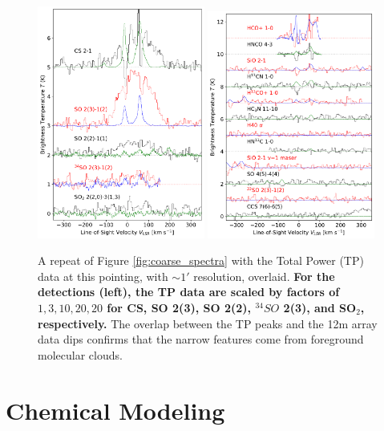 \documentclass[]{aastex631}
\def\rr#1{\textbf{#1}}
\begin{document}
\begin{figure}
    \centering
    \includegraphics[width=0.49\textwidth]{figures/CSandSO_Overlays_withTP.pdf}
    \includegraphics[width=0.49\textwidth]{figures/NonDetection_Overlays_withTP.pdf}
    \caption{A repeat of Figure \ref{fig:coarse_spectra} with the Total Power (TP) data at this pointing, with $\sim1'$ resolution, overlaid.
    \rr{For the detections (left), the TP data are scaled by factors of $1, 3, 10, 20, 20$ for CS, SO 2(3), SO 2(2), $^{34}SO$ 2(3), and SO$_2$, respectively.}
    The overlap between the TP peaks and the 12m array data dips confirms that the narrow features come from foreground molecular clouds.
    }
    \label{fig:coarse_spectra_withTP}
\end{figure}

\section{Chemical Modeling}
\label{appendix:chemistry}
\end{document}
